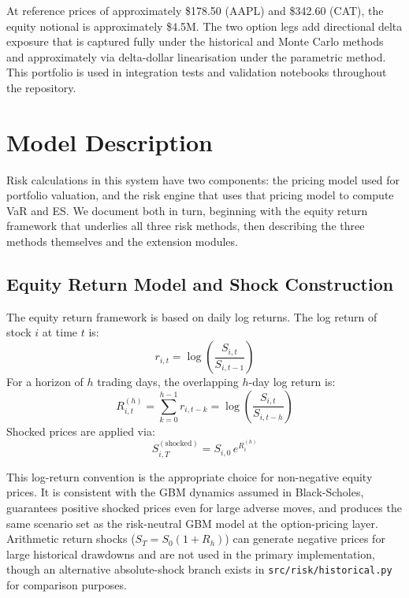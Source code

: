 \documentclass[11pt]{article}
\newcommand{\code}[1]{\texttt{#1}}
\begin{document}
At reference prices of approximately \$178.50 (AAPL) and \$342.60 (CAT), the
equity notional is approximately \$4.5M.  The two option legs add directional
delta exposure that is captured fully under the historical and Monte Carlo
methods and approximately via delta-dollar linearisation under the parametric
method.  This portfolio is used in integration tests and validation notebooks
throughout the repository.

\section{Model Description}

Risk calculations in this system have two components: the pricing model used
for portfolio valuation, and the risk engine that uses that pricing model to
compute VaR and ES.  We document both in turn, beginning with the equity return
framework that underlies all three risk methods, then describing the three
methods themselves and the extension modules.

\subsection{Equity Return Model and Shock Construction}

The equity return framework is based on daily log returns.  The log return of
stock $i$ at time $t$ is:
\begin{equation}
  r_{i,t} = \log\!\left(\frac{S_{i,t}}{S_{i,t-1}}\right)
  \label{eq:log_return}
\end{equation}
For a horizon of $h$ trading days, the overlapping $h$-day log return is:
\begin{equation}
  R_{i,t}^{(h)} = \sum_{k=0}^{h-1} r_{i,t-k} = \log\!\left(\frac{S_{i,t}}{S_{i,t-h}}\right)
  \label{eq:horizon_return}
\end{equation}
Shocked prices are applied via:
\begin{equation}
  S_{i,T}^{(\mathrm{shocked})} = S_{i,0}\, e^{R_{i}^{(h)}}
  \label{eq:shocked_price}
\end{equation}

This log-return convention is the appropriate choice for non-negative equity
prices.  It is consistent with the GBM dynamics assumed in Black-Scholes,
guarantees positive shocked prices even for large adverse moves, and produces
the same scenario set as the risk-neutral GBM model at the option-pricing
layer.  Arithmetic return shocks ($S_T = S_0(1 + R_h)$) can generate negative
prices for large historical drawdowns and are not used in the primary
implementation, though an alternative absolute-shock branch exists in
\code{src/risk/historical.py} for comparison purposes.
\end{document}
